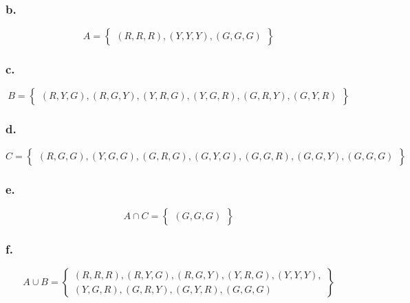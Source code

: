 \documentclass[11pt]{article}
\begin{document}
\subsubsection*{b.}
\[ A = \left\{ 
    \begin{array}{c}
        \left( R, R, R \right),
        \left( Y, Y, Y \right),
        \left( G, G, G \right)
    \end{array}
\right\} \]

\subsubsection*{c.}
\[ B = \left\{ 
    \begin{array}{c}
        \left( R, Y, G \right),
        \left( R, G, Y \right),
        \left( Y, R, G \right),
        \left( Y, G, R \right),
        \left( G, R, Y \right),
        \left( G, Y, R \right)
    \end{array}
\right\} \]

\subsubsection*{d.}
\[ C = \left\{ 
    \begin{array}{c}
        \left( R, G, G \right),
        \left( Y, G, G \right), 
        \left( G, R, G \right),
        \left( G, Y, G \right),
        \left( G, G, R \right),
        \left( G, G, Y \right),
        \left( G, G, G \right)
    \end{array}
\right\} \]

\subsubsection*{e.}
\[ A \cap C = \left\{ 
    \begin{array}{c}
        \left( G, G, G \right)
    \end{array}
\right\} \]

\subsubsection*{f.}
\[ A \cup B = \left\{ 
    \begin{array}{c}
        \left( R, R, R \right),
        \left( R, Y, G \right),
        \left( R, G, Y \right),
        \left( Y, R, G \right),
        \left( Y, Y, Y \right), \\
        \left( Y, G, R \right),
        \left( G, R, Y \right),
        \left( G, Y, R \right),
        \left( G, G, G \right)
    \end{array}
\right\} \]
\end{document}
